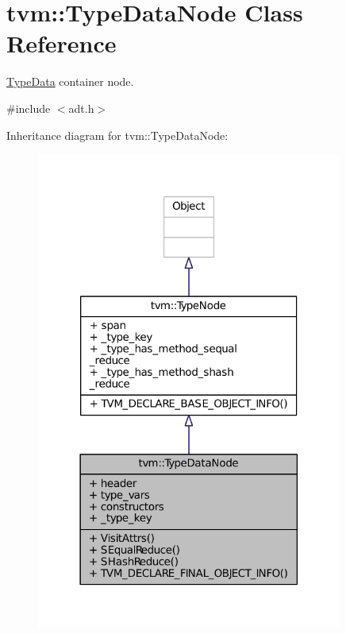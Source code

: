 \hypertarget{classtvm_1_1TypeDataNode}{}\section{tvm\+:\+:Type\+Data\+Node Class Reference}
\label{classtvm_1_1TypeDataNode}


\hyperlink{classtvm_1_1TypeData}{Type\+Data} container node.  




{\ttfamily \#include $<$adt.\+h$>$}



Inheritance diagram for tvm\+:\+:Type\+Data\+Node\+:
\nopagebreak
\begin{figure}[H]
\begin{center}
\leavevmode
\includegraphics[width=285pt]{classtvm_1_1TypeDataNode__inherit__graph}
\end{center}
\end{figure}


